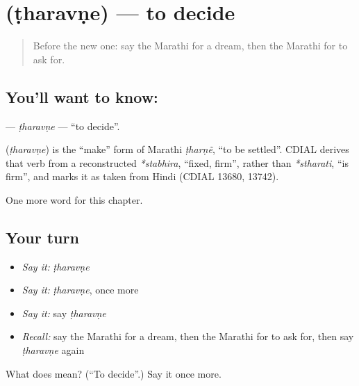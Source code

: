 \section[\texorpdfstring{\mr{ठरवणे} (ṭharavṇe)}{ठरवणे (ṭharavṇe)}]{ (ṭharavṇe) — to decide}

\label{lesson:MR-C123-tharavne}



\begin{quote}
Before the new one: say the Marathi for a dream, then the Marathi for to ask for.
\end{quote}

\subsection*{You'll want to know: }
\textbf{} — \emph{ṭharavṇe} — \textquotedblleft{}to decide\textquotedblright{}.

\begin{cousinweb}
\textbf{} (\emph{ṭharavṇe}) is the \textquotedblleft{}make\textquotedblright{} form of Marathi \emph{ṭharṇẽ}, \textquotedblleft{}to be settled\textquotedblright{}. CDIAL derives that verb from a reconstructed \emph{*stabhira}, \textquotedblleft{}fixed, firm\textquotedblright{}, rather than \emph{*stharati}, \textquotedblleft{}is firm\textquotedblright{}, and marks it as taken from Hindi (CDIAL 13680, 13742).
\end{cousinweb}

\begin{grammarlens}[title={What you've built}]
One more word for this chapter.
\end{grammarlens}

\subsection*{Your turn}
\begin{itemize}
\raggedright
  \item \emph{Say it:} \emph{ṭharavṇe}
  \item \emph{Say it:} \emph{ṭharavṇe}, once more
  \item \emph{Say it:} say \emph{ṭharavṇe}
  \item \emph{Recall:} say the Marathi for a dream, then the Marathi for to ask for, then say \emph{ṭharavṇe} again
\end{itemize}

\begin{tcolorbox}[breakable,colback=teal!4,colframe=teal!35!black,title={Before you move on}]
What does  mean? (\textquotedblleft{}To decide\textquotedblright{}.) Say it once more.
\end{tcolorbox}
